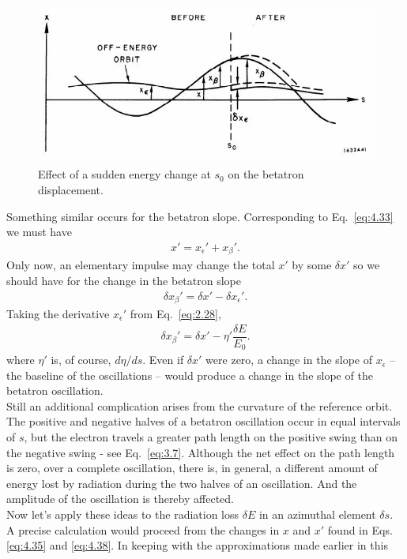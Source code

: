 \begin{figure}[!htb]
	\centering
	\includegraphics[width=0.8\linewidth]{./Figuras/fig41.jpeg}
	\caption{Effect of a sudden energy change at $s_0$ on the betatron displacement.}
	\label{fig:fig41}
\end{figure}
Something similar occurs for the betatron slope. Corresponding to Eq.~\eqref{eq:4.33} we must have
\begin{align}
	x' = x_\epsilon'+x_\beta'.
\end{align}
Only now, an elementary impulse may change the total $x'$ by some $\delta x'$ so we should
have for the change in the betatron slope
\begin{align}
	\delta x_\beta' = \delta x' - \delta x_\epsilon'.
\end{align}
Taking the derivative $x_\epsilon'$ from Eq.~\eqref{eq:2.28},
\begin{align} \label{eq:4.38}
	\delta x_\beta' = \delta x' - \eta' \dfrac{\delta E}{E_0}.
\end{align}
where $\eta'$ is, of course, $d\eta/ds$. Even if $\delta x'$ were zero, a change in the slope of $x_\epsilon$ -- the baseline of the oscillations -- would produce a change in the slope of the betatron oscillation.\\
Still an additional complication arises from the curvature of the reference orbit. The positive
 and negative halves of a betatron oscillation occur in equal intervals of $s$, but the electron
 travels a greater path length on the positive swing than on the negative swing - see Eq.~\eqref{eq:3.7}. Although the net effect on the path length is zero, over a complete oscillation, there is, in general, a different amount of energy lost by radiation during the two halves of an oscillation. And the amplitude of the oscillation is thereby affected.\\
Now let's apply these ideas to the radiation loss $\delta E$ in an azimuthal element $\delta s$.
 A precise calculation would proceed from the changes in $x$ and $x'$ found in Eqs. \eqref{eq:4.35} and \eqref{eq:4.38}. In keeping with the approximations made earlier in this
